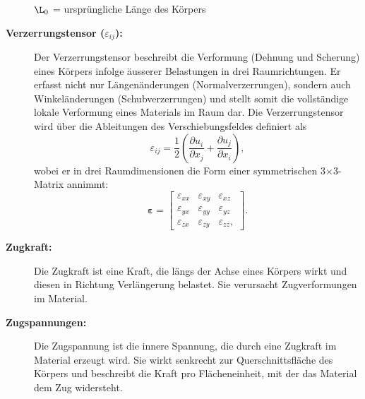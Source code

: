 \begin{description}
	$\L_0$ = ursprüngliche Länge des Körpers
	
	\item[\textbf{Verzerrungstensor ($\varepsilon_{ij}$):}] Der Verzerrungstensor beschreibt die Verformung (Dehnung und Scherung) eines Körpers infolge äusserer Belastungen in drei Raumrichtungen. 
	Er erfasst nicht nur Längenänderungen (Normalverzerrungen), sondern auch Winkeländerungen (Schubverzerrungen) und stellt somit die vollständige lokale Verformung eines Materials im Raum dar.
	Die Verzerrungstensor wird über die Ableitungen des Verschiebungsfeldes definiert als
	\begin{equation}
		\varepsilon_{ij} = 
		\frac{1}{2} \left( \frac{\partial u_i}{\partial x_j} + \frac{\partial u_j}{\partial x_i} \right),
	\end{equation}
	wobei er in drei Raumdimensionen die Form einer symmetrischen 3×3-Matrix annimmt:
	\begin{equation}
		\boldsymbol{\varepsilon} =
		\begin{bmatrix}
			\varepsilon_{xx} & \varepsilon_{xy} & \varepsilon_{xz} \\
			\varepsilon_{yx} & \varepsilon_{yy} & \varepsilon_{yz} \\
			\varepsilon_{zx} & \varepsilon_{zy} & \varepsilon_{zz},
		\end{bmatrix}.
	\end{equation}
	\item[\textbf{Zugkraft:}] Die Zugkraft ist eine Kraft, die längs der Achse eines Körpers wirkt und diesen in Richtung Verlängerung belastet. 
	Sie verursacht Zugverformungen im Material.
	
	\item[\textbf{Zugspannungen:}] Die Zugspannung ist die innere Spannung, die durch eine Zugkraft im Material erzeugt wird. 
	Sie wirkt senkrecht zur Querschnittsfläche des Körpers und beschreibt die Kraft pro Flächeneinheit, mit der das Material dem Zug widersteht.
\end{description}

